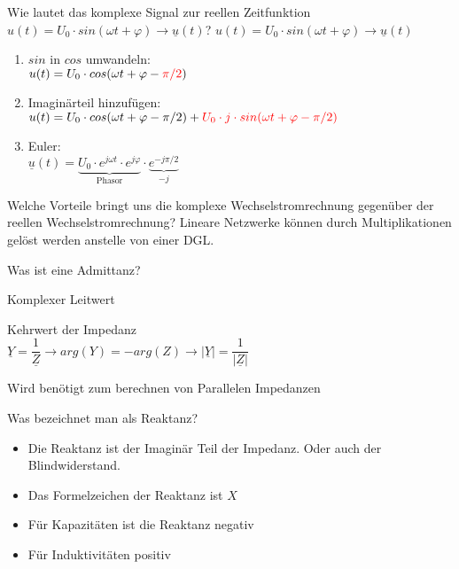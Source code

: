 
\begin{karte}{Wie lautet das komplexe Signal zur reellen Zeitfunktion\\
	$ u(t) = U_0 \cdot sin(\omega t + \varphi) \rightarrow  \underline{u}(t)$?}
$ u(t) = U_0 \cdot sin(\omega t + \varphi) \rightarrow  \underline{u}(t)$\\
\begin{enumerate}
	\item $ sin $ in $ cos $ umwandeln:\\
	$ u(t)=U_0 \cdot cos(\omega t + \varphi - \color{red}{\pi/2} \normalcolor) $
	\item Imaginärteil hinzufügen:\\
	$ u(t)=U_0 \cdot cos(\omega t + \varphi - \pi/2) + 
	\color{red}{U_0 \cdot j \cdot sin (\omega t + \varphi-\pi/2)}$
	\item Euler:\\
	$ \underline{u}(t) = \underbrace{U_0 \cdot e^{j\omega t} \cdot 
		e^{j\varphi}}_{\text{Phasor}} \cdot \underbrace{e^{-j \pi/2}}_{-j} $
\end{enumerate}
\end{karte}

\begin{karte}{Welche Vorteile bringt uns die komplexe Wechselstromrechnung gegenüber der reellen Wechselstromrechnung?}
	Lineare Netzwerke können durch Multiplikationen gelöst werden anstelle von einer DGL.
\end{karte}

\begin{karte}{Was ist eine Admittanz?}
	\begin{compactitem}
		\item Komplexer Leitwert
		\item Kehrwert der Impedanz \\
		$ \underline{Y} = \dfrac{1}{\underline{Z}} \rightarrow arg(Y)=-arg(Z) \rightarrow \left|\underline{Y}\right| = \dfrac{1}{\left|\underline{Z}\right|} $
		\item Wird benötigt zum berechnen von Parallelen Impedanzen		
	\end{compactitem}
	\vspace{3mm}
	
\end{karte}

\begin{karte}{Was bezeichnet man als Reaktanz?}
	\begin{itemize}
		\item Die Reaktanz ist der Imaginär Teil der Impedanz. Oder auch der Blindwiderstand.
		\item Das Formelzeichen der Reaktanz ist $X$
		\item Für Kapazitäten ist die Reaktanz negativ
		\item Für Induktivitäten positiv
	\end{itemize}
\end{karte}

